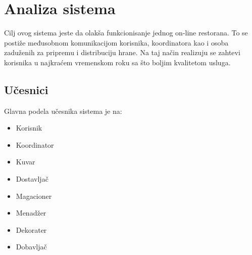 \section{Analiza sistema}
Cilj ovog sistema jeste da olakša funkcionisanje jednog on-line restorana. To se postiže međusobnom komunikacijom korisnika, koordinatora kao i osoba zaduženih za pripremu i distribuciju hrane. Na taj način realizuju se zahtevi korisnika u najkraćem vremenskom roku sa što boljim kvalitetom usluga.







\subsection{Učesnici}
Glavna podela učesnika sistema je na:

\begin{itemize}
    \item Korisnik 
    \item Koordinator
    \item Kuvar
    \item Dostavljač
    \item Magacioner
    \item Menadžer
    \item Dekorater
    \item Dobavljač
\end{itemize}
